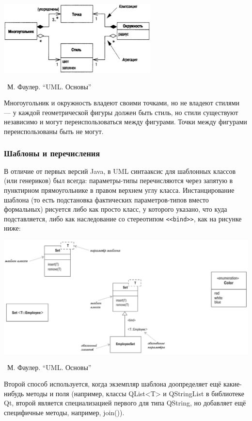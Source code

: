 \documentclass[a5paper]{article}
\newcommand{\attribution}[1] {
	\vspace{-5mm}\begin{flushright}\begin{scriptsize}%
	{\textcopyright\, #1}\end{scriptsize}\end{flushright}
}
\begin{document}
\begin{center}
	\includegraphics[width=0.6\textwidth]{aggregationAndCompositionExample.png}
	\attribution{М. Фаулер. ``UML. Основы''}
\end{center}

Многоугольник и окружность владеют своими точками, но не владеют стилями --- у каждой геометрической фигуры должен быть стиль, но стили существуют независимо и могут переиспользоваться между фигурами. Точки между фигурами переиспользованы быть не могут.

\subsubsection{Шаблоны и перечисления}

В отличие от первых версий Java, в UML синтааксис для шаблонных классов (или генериков) был всегда: параметры-типы перечисляются через запятую в пунктирном прямоугольнике в правом верхнем углу класса. Инстанцирование шаблона (то есть подстановка фактических параметров-типов вместо формальных) рисуется либо как просто класс, у которого указано, что куда подставляется, либо как наследование со стереотипом \verb|<<bind>>|, как на рисунке ниже:

\begin{center}
	\includegraphics[width=\textwidth]{genericsAndEnums.png}
	\attribution{М. Фаулер. ``UML. Основы''}
\end{center}

Второй способ используется, когда экземпляр шаблона доопределяет ещё какие-нибудь методы и поля (например, классы QList<T> и QStringList в библиотеке Qt, второй является специализацией первого для типа QString, но добавляет ещё специфичные методы, например, join()).
\end{document}
